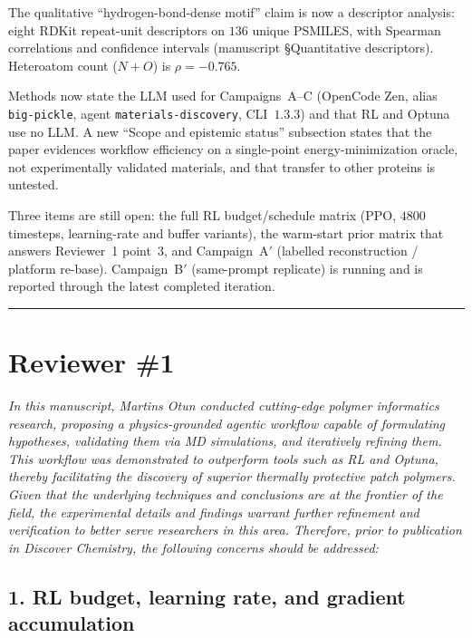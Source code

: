 \documentclass[11pt]{article}
\begin{document}
The qualitative ``hydrogen-bond-dense motif'' claim is now a descriptor analysis: eight RDKit repeat-unit descriptors on $136$ unique PSMILES, with Spearman correlations and confidence intervals (manuscript \S Quantitative descriptors).
Heteroatom count ($N{+}O$) is $\rho=-0.765$.

Methods now state the LLM used for Campaigns~A--C (OpenCode Zen, alias \texttt{big-pickle}, agent \texttt{materials-discovery}, CLI~$1.3.3$) and that RL and Optuna use no LLM.
A new ``Scope and epistemic status'' subsection states that the paper evidences workflow efficiency on a single-point energy-minimization oracle, not experimentally validated materials, and that transfer to other proteins is untested.

Three items are still open: the full RL budget/schedule matrix (PPO, $4800$ timesteps, learning-rate and buffer variants), the warm-start prior matrix that answers Reviewer~1 point~3, and Campaign~A$'$ (labelled reconstruction / platform re-base).
Campaign~B$'$ (same-prompt replicate) is running and is reported through the latest completed iteration.

\newpage

\bigskip\hrule\bigskip

\section*{Reviewer \#1}

\noindent\textit{In this manuscript, Martins Otun conducted cutting-edge polymer informatics research, proposing a physics-grounded agentic workflow capable of formulating hypotheses, validating them via MD simulations, and iteratively refining them. This workflow was demonstrated to outperform tools such as RL and Optuna, thereby facilitating the discovery of superior thermally protective patch polymers. Given that the underlying techniques and conclusions are at the frontier of the field, the experimental details and findings warrant further refinement and verification to better serve researchers in this area. Therefore, prior to publication in Discover Chemistry, the following concerns should be addressed:}

\subsection*{1. RL budget, learning rate, and gradient accumulation}
\end{document}
